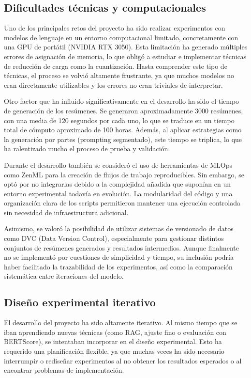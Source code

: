 

	\subsection{Dificultades técnicas y computacionales}
	
	Uno de los principales retos del proyecto ha sido realizar experimentos con modelos de lenguaje en un entorno computacional limitado, concretamente con una GPU de portátil (NVIDIA RTX 3050). Esta limitación ha generado múltiples errores de asignación de memoria, lo que obligó a estudiar e implementar técnicas de reducción de carga como la cuantización. Hasta comprender este tipo de técnicas, el proceso se volvió altamente frustrante, ya que muchos modelos no eran directamente utilizables y los errores no eran triviales de interpretar.
	
	Otro factor que ha influido significativamente en el desarrollo ha sido el tiempo de generación de los resúmenes. Se generaron aproximadamente 3000 resúmenes, con una media de 120 segundos por cada uno, lo que se traduce en un tiempo total de cómputo aproximado de 100 horas. Además, al aplicar estrategias como la generación por partes (prompting segmentado), este tiempo se triplica, lo que ha ralentizado mucho el proceso de prueba y validación.
	
	Durante el desarrollo también se consideró el uso de herramientas de MLOps como ZenML para la creación de flujos de trabajo reproducibles. Sin embargo, se optó por no integrarlas debido a la complejidad añadida que suponían en un entorno experimental todavía en evolución. La modularidad del código y una organización clara de los scripts permitieron mantener una ejecución controlada sin necesidad de infraestructura adicional.
	
	Asimismo, se valoró la posibilidad de utilizar sistemas de versionado de datos como DVC (Data Version Control), especialmente para gestionar distintos conjuntos de resúmenes generados y resultados intermedios. Aunque finalmente no se implementó por cuestiones de simplicidad y tiempo, su inclusión podría haber facilitado la trazabilidad de los experimentos, así como la comparación sistemática entre iteraciones del modelo.
	
	\subsection{Diseño experimental iterativo}
	
	El desarrollo del proyecto ha sido altamente iterativo. Al mismo tiempo que se iban aprendiendo nuevas técnicas (como RAG, ajuste fino o evaluación con BERTScore), se intentaban incorporar en el diseño experimental. Esto ha requerido una planificación flexible, ya que muchas veces ha sido necesario interrumpir o rediseñar experimentos al no obtener los resultados esperados o al encontrar problemas de implementación.
	
